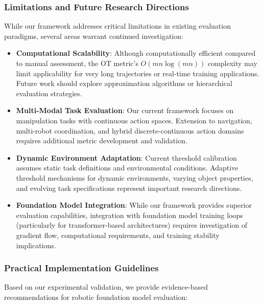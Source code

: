 \documentclass[10pt,twocolumn]{article}
\begin{document}
\subsubsection{Limitations and Future Research Directions}

While our framework addresses critical limitations in existing evaluation paradigms, several areas warrant continued investigation:

\begin{itemize}
    \item \textbf{Computational Scalability}: Although computationally efficient compared to manual assessment, the OT metric's $O(mn \log(mn))$ complexity may limit applicability for very long trajectories or real-time training applications. Future work should explore approximation algorithms or hierarchical evaluation strategies.
    
    \item \textbf{Multi-Modal Task Evaluation}: Our current framework focuses on manipulation tasks with continuous action spaces. Extension to navigation, multi-robot coordination, and hybrid discrete-continuous action domains requires additional metric development and validation.
    
    \item \textbf{Dynamic Environment Adaptation}: Current threshold calibration assumes static task definitions and environmental conditions. Adaptive threshold mechanisms for dynamic environments, varying object properties, and evolving task specifications represent important research directions.
    
    \item \textbf{Foundation Model Integration}: While our framework provides superior evaluation capabilities, integration with foundation model training loops (particularly for transformer-based architectures) requires investigation of gradient flow, computational requirements, and training stability implications.
\end{itemize}

\subsubsection{Practical Implementation Guidelines}

Based on our experimental validation, we provide evidence-based recommendations for robotic foundation model evaluation:
\end{document}
